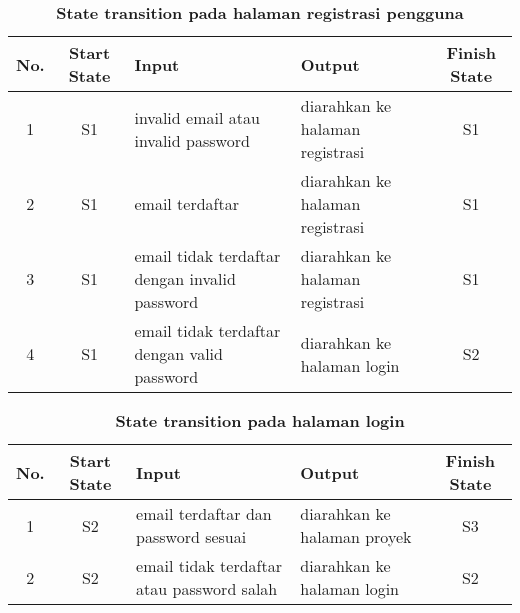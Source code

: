 \begin{table}
  \caption{\textbf{State transition pada halaman registrasi pengguna}}
  \label{table:register-page}
  \centering
  \begin{tabular}{| c | c | m{45mm} | m{45mm} | c |}
    \hline
    \textbf{No.} & \textbf{Start State} & \textbf{Input} & \textbf{Output} & \textbf{Finish State} \\ [0.5ex]
    \hline
    1 & S1 & invalid email atau invalid password & diarahkan ke halaman registrasi & S1 \\
    2 & S1 & email terdaftar & diarahkan ke halaman registrasi & S1 \\
    3 & S1 & email tidak terdaftar dengan invalid password & diarahkan ke halaman registrasi & S1 \\    
    4 & S1 & email tidak terdaftar dengan valid password & diarahkan ke halaman login & S2 \\ [1ex]
    \hline
  \end{tabular}
\end{table}

\begin{table}
  \caption{\textbf{State transition pada halaman login}}
  \label{table:login-page}
  \centering
  \begin{tabular}{|c | c | m{45mm} | m{45mm} | c |}
    \hline
    \textbf{No.} & \textbf{Start State} & \textbf{Input} & \textbf{Output} & \textbf{Finish State} \\ [0.5ex]
    \hline
    1 & S2 & email terdaftar dan password sesuai & diarahkan ke halaman proyek & S3 \\
    2 & S2 & email tidak terdaftar atau password salah & diarahkan ke halaman login & S2 \\ [1ex]
    \hline
  \end{tabular}
\end{table}


